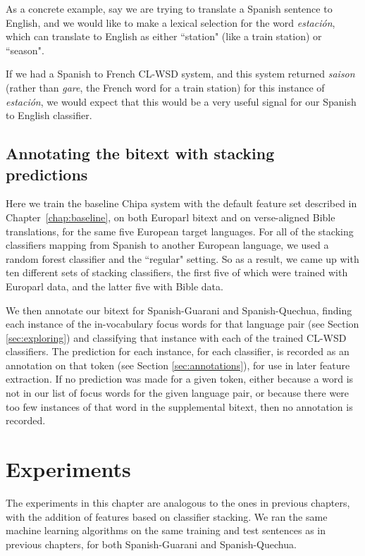As a concrete example, say we are trying to translate a Spanish sentence to
English, and we would like to make a lexical selection for the word
\emph{estación}, which can translate to English as either ``station" (like a
train station) or ``season".

\label{sent:estacion}

If we had a Spanish to French CL-WSD system, and this system returned
\emph{saison} (rather than \emph{gare}, the French word for a train station)
for this instance of \emph{estación}, we would expect that this would be a very
useful signal for our Spanish to English classifier.

\subsection{Annotating the bitext with stacking predictions}

Here we train the baseline Chipa system with the default feature set described
in Chapter~\ref{chap:baseline}, on both Europarl bitext and on verse-aligned
Bible translations, for the same five European target languages. For all of
the stacking classifiers mapping from Spanish to another European language, we
used a random forest classifier and the ``regular" setting. So as a result, we
came up with ten different sets of stacking classifiers, the first five of
which were trained with Europarl data, and the latter five with Bible data.

We then annotate our bitext for Spanish-Guarani and Spanish-Quechua, finding
each instance of the in-vocabulary focus words for that language pair (see
Section \ref{sec:exploring}) and classifying that instance with each of the
trained CL-WSD classifiers. The prediction for each instance, for each
classifier, is recorded as an annotation on that token (see Section
\ref{sec:annotations}), for use in later feature extraction. If no prediction
was made for a given token, either because a word is not in our list of focus
words for the given language pair, or because there were too few instances of
that word in the supplemental bitext, then no annotation is recorded.

\section{Experiments}
\label{sec:multilingual-experiments}

The experiments in this chapter are analogous to the ones in previous chapters,
with the addition of features based on classifier stacking. We ran the same
machine learning algorithms on the same training and test sentences as in
previous chapters, for both Spanish-Guarani and Spanish-Quechua.

